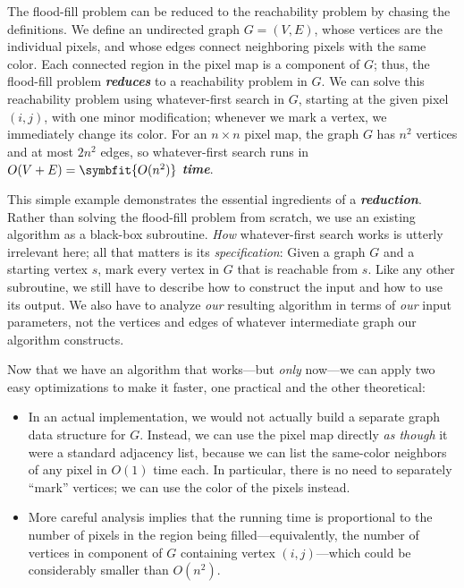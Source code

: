 The flood-fill problem can be reduced to the reachability problem by chasing the definitions.
We define an undirected graph $G = (V, E)$, whose vertices are the individual pixels, and whose edges connect neighboring pixels with the same color.
Each connected region in the pixel map is a component of $G$; thus, the flood-fill problem \textbf{\textit{reduces}} to a reachability problem in $G$.
We can solve this reachability problem using whatever-first search in $G$, starting at the given pixel $(i, j)$, with one minor modification; whenever we mark a vertex, we immediately change its color.
For an $n \times n$ pixel map, the graph $G$ has $n^2$ vertices and at most $2n^2$ edges, so whatever-first search runs in $O(V + E) = \symbfit{O(n^2)}$ \textbf{\textit{time}}.

This simple example demonstrates the essential ingredients of a \textbf{\textit{reduction}}.
Rather than solving the flood-fill problem from scratch, we use an existing algorithm as a black-box subroutine.
\textit{How} whatever-first search works is utterly irrelevant here; all that matters is its \textit{specification}: Given a graph $G$ and a starting vertex $s$, mark every vertex in $G$ that is reachable from $s$.
Like any other subroutine, we still have to describe how to construct the input and how to use its output.
We also have to analyze \textit{our} resulting algorithm in terms of \textit{our} input parameters, not the vertices and edges of whatever intermediate graph our algorithm constructs.

Now that we have an algorithm that works---but \textit{only} now---we can apply two easy optimizations to make it faster, one practical and the other theoretical:
\begin{itemize}
\item In an actual implementation, we would not actually build a separate graph data structure for $G$.
Instead, we can use the pixel map directly \textit{as though} it were a standard adjacency list, because we can list the same-color neighbors of any pixel in $O(1)$ time each.
In particular, there is no need to separately “mark” vertices; we can use the color of the pixels instead.
\item More careful analysis implies that the running time is proportional to the number of pixels in the region being filled---equivalently, the number of vertices in component of $G$ containing vertex $(i, j)$---which could be considerably smaller than $O(n^2)$.
\end{itemize}

